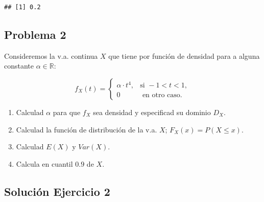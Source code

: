 \documentclass[
]{article}
\providecommand{\tightlist}{%
  \setlength{\itemsep}{0pt}\setlength{\parskip}{0pt}}
\begin{document}
\begin{verbatim}
## [1] 0.2
\end{verbatim}

\hypertarget{problema-2}{%
\subsection{Problema 2}\label{problema-2}}

Consideremos la v.a. continua \(X\) que tiene por función de densidad
para a alguna constante \(\alpha\in \mathbb{R}\):

\[
f_X (t)=
\left\{\begin{array}{ll}
\alpha \cdot t^4, & \mbox{si } -1 < t <1,
 \\
0 & \mbox{ en otro caso}.
\end{array}\right.
\]

\begin{enumerate}
\def\labelenumi{\arabic{enumi}.}
\tightlist
\item
  Calculad \(\alpha\) para que \(f_X\) sea densidad y especificad su
  dominio \(D_X\).
\item
  Calculad la función de distribución de la v.a. \(X\);
  \(F_X(x)=P(X\leq x)\).
\item
  Calculad \(E(X)\) y \(Var(X)\).
\item
  Calcula en cuantil \(0.9\) de \(X\).
\end{enumerate}

\hypertarget{soluciuxf3n-ejercicio-2}{%
\subsection{Solución Ejercicio 2}\label{soluciuxf3n-ejercicio-2}}
\end{document}
